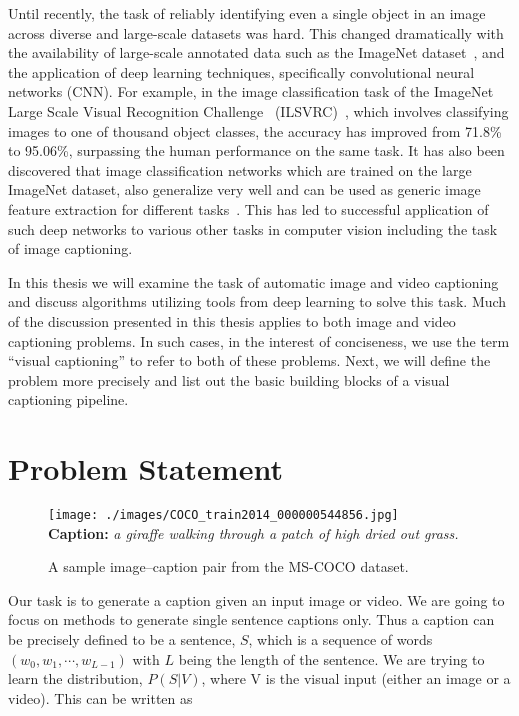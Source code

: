 Until recently, the task of reliably identifying even a single object in an image
across diverse and large-scale datasets was hard.
This changed dramatically with the availability of large-scale annotated data
such as the ImageNet dataset~\cite{ImagenetOrig}, and the application of deep
learning techniques, specifically convolutional neural networks (CNN).
For example, in the image classification task of the ImageNet Large Scale Visual
Recognition Challenge~ (ILSVRC)~\cite{ILSVRC15}, which involves classifying
images to one of thousand object classes, the accuracy has improved from 71.8\%
to 95.06\%, surpassing the human performance on the same task. 
It has also been discovered that image classification networks which are
trained on the large ImageNet dataset, also generalize very well and can be
used as generic image feature extraction for different
tasks~\cite{yosinski2014transferable}.
This has led to successful application of such deep networks to various other
tasks in computer vision including the task of image captioning.

In this thesis we will examine the task of automatic image and video captioning and
discuss algorithms utilizing tools from deep learning to solve this task.
Much of the discussion presented in this thesis applies to both image and video
captioning problems.
In such cases, in the interest of conciseness, we use the term ``visual
captioning'' to refer to both of these problems.
Next, we will define the problem more precisely and list out the basic building
blocks of a visual captioning pipeline.

\section{Problem Statement}
\begin{figure}[th]
	\centering
	\texttt{[image: ./images/COCO\_train2014\_000000544856.jpg]}\\
    \textbf{Caption:} \emph{a giraffe walking through a patch of high dried out grass.}
	\caption{A sample image--caption pair from the MS-COCO dataset.}
	\label{fig:ExampleCap}
\end{figure}

Our task is to generate a caption given an input image or video. 
We are going to focus on methods to generate single sentence captions only. 
Thus a caption can be precisely defined to be a sentence, $S$, which is a
sequence of words $(w_0, w_1,\cdots, w_{L-1})$ with $L$ being the length of the
sentence. 
We are trying to learn the distribution, $P(S|V)$, where V is the visual
input (either an image or a video). 
This can be written as 


